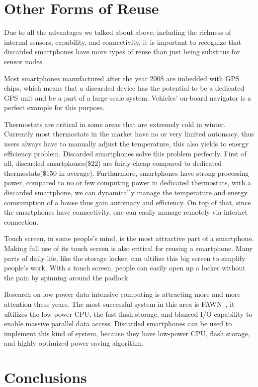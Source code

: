 \section{Other Forms of Reuse}
\label{sec-other}

Due to all the advantages we talked about above, including the richness of internal sensors, capability, and connectivity, it is important to recognize that discarded smartphones have more types of reuse than just being substitus for sensor nodes.


Most smartphones manufactured after the year 2008 are imbedded with GPS chips, which means that a discarded device has the potential to be a dedicated GPS unit and be a part of  a large-scale system. Vehicles' on-board navigator is a perfect example for this purpose. 


Thermostats are critical in some areas that are extremely cold in winter. Currently most thermostats in the market have no or very limited automacy, thus users always have to manually adjust the temperature, this also yields to energy efficiency problem.  Discarded smartphones solve this problem perfectly. First of all, discarded smartphones(\$22) are fairly cheap compared to dedicated thermostats(\$150 in average). Furthurmore, smartphones have strong processing power, compared to no or few computing power in dedicated thermostats, with a discarded smartphone, we can dynamically manage the temperature and energy comsumption of a house thus gain automacy and efficiency. On top of that, since the smartphones have connectivity, one can easily manage remotely via internet connection. 


Touch screen, in some people's mind, is the most attractive part of a smartphone. Making full use of its touch screen is also critical for reusing a smartphone. Many parts of daily life, like the storage locker, can ultilize this big screen to simplify people's work. With a touch screen, people can easily open up a locker without the pain by spinning around the padlock. 

Research on low power data intensive computing is attracting more and more attention these years. The most successful system in this area is FAWN~\cite{fawn}, it ultilizes the low-power CPU, the fast flash storage, and blanced I/O capability to enable massive parallel data access. Discarded smartphones can be used to implement this kind of system, because they have low-power CPU, flash storage, and highly optimized power saving algorithm. 


\section{Conclusions}
\label{sec-conclusion}

